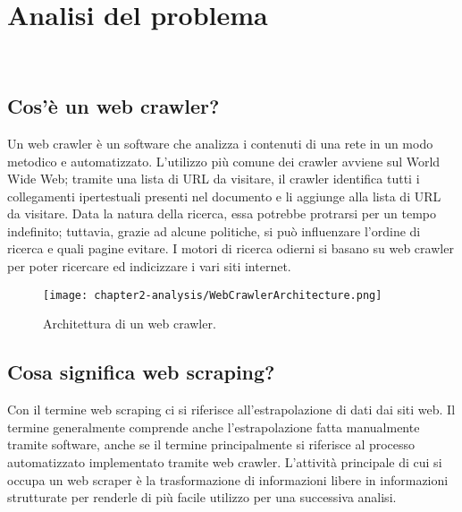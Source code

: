 
\chapter{Analisi del problema}
\label{cap:analisi-del-problema}

\\

\section{Cos'è un web crawler?}

Un web crawler è un software che analizza i contenuti di una rete in un modo metodico e automatizzato. L'utilizzo più comune dei crawler avviene sul World Wide Web; tramite una lista di URL da visitare, il crawler identifica tutti i collegamenti ipertestuali presenti nel documento e li aggiunge alla lista di URL da visitare. Data la natura della ricerca, essa potrebbe protrarsi per un tempo indefinito; tuttavia, grazie ad alcune politiche, si può influenzare l'ordine di ricerca e quali pagine evitare. I motori di ricerca odierni si basano su web crawler per poter ricercare ed indicizzare i vari siti internet.

\begin{figure}[!h] 
    \centering 
    \texttt{[image: chapter2-analysis/WebCrawlerArchitecture.png]} 
    \caption{Architettura di un web crawler.}
\end{figure}

\section{Cosa significa web scraping?}

Con il termine web scraping ci si riferisce all'estrapolazione di dati dai siti web. Il termine generalmente comprende anche l'estrapolazione fatta manualmente tramite software, anche se il termine principalmente si riferisce al processo automatizzato implementato tramite web crawler. L'attività principale di cui si occupa un web scraper è la trasformazione di informazioni libere in informazioni strutturate per renderle di più facile utilizzo per una successiva analisi. 

